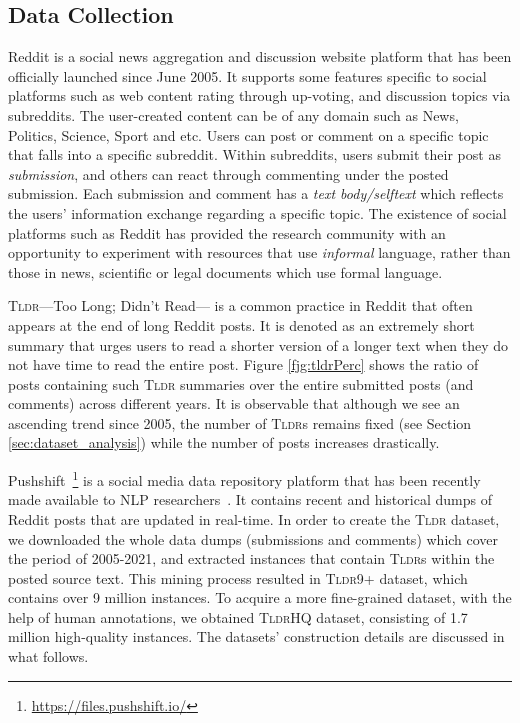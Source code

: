 \documentclass[11pt]{article}
\newcommand{\tldrl}{\textsc{Tldr9+}}
\newcommand{\tldrs}{\textsc{TldrHQ}}
\newcommand{\tldr}{\textsc{Tldr}}
\begin{document}
\subsection{Data Collection}
Reddit is a social news aggregation and discussion website platform that has been officially launched since June 2005. It supports some features specific to social platforms such as web content rating through up-voting, and discussion topics via subreddits. The user-created content can be of any domain such as News, Politics, Science, Sport and etc. Users can post or comment on a specific topic that falls into a specific subreddit. Within subreddits, users submit their post as \textit{submission}, and others can react through commenting under the posted submission. Each submission and comment has a \textit{text body/selftext} which reflects the users' information exchange regarding a specific topic. The existence of social platforms such as Reddit has provided the research community with an opportunity to experiment with resources that use \textit{informal} language, rather than those in news, scientific or legal documents which use formal language. 

\tldr ---Too Long; Didn't Read--- is a common practice in Reddit that often appears at the end of long Reddit posts. It is denoted as an extremely short summary that urges users to read a shorter version of a longer text when they do not have time to read the entire post. Figure \ref{fjg:tldrPerc} shows the ratio of posts containing such \tldr{} summaries over the entire submitted posts (and comments) across different years. It is observable that although we see an ascending trend since 2005, the number of \tldr s remains fixed (see Section \ref{sec:dataset_analysis}) while the number of posts increases drastically.

Pushshift~\footnote{\url{https://files.pushshift.io/}} is a social media data repository platform that has been recently made available to NLP researchers~\cite{Baumgartner2020ThePR}. It contains recent and historical dumps of Reddit posts that are updated in real-time. In order to create the \tldr{} dataset, we downloaded the whole data dumps (submissions and comments) which cover the period of 2005-2021, and extracted instances that contain \tldr s within the posted source text. This mining process resulted in \tldrl{} dataset, which contains over 9 million instances. To acquire a more fine-grained dataset, with the help of human annotations, we obtained \tldrs{} dataset, consisting of 1.7 million high-quality instances. The datasets' construction details are discussed in what follows.
\end{document}
